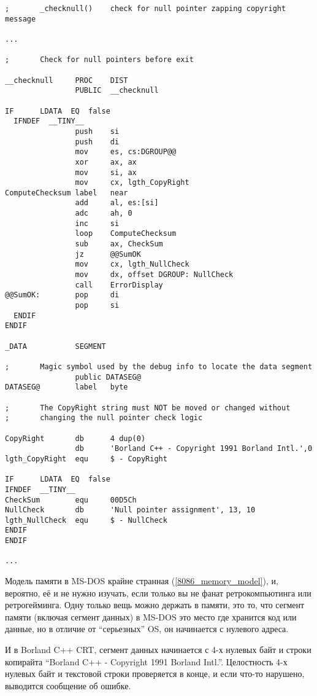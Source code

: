 \begin{lstlisting}[style=customasmx86]
;       _checknull()    check for null pointer zapping copyright message

...

;       Check for null pointers before exit

__checknull     PROC    DIST
                PUBLIC  __checknull

IF      LDATA  EQ  false
  IFNDEF  __TINY__
                push    si
                push    di
                mov     es, cs:DGROUP@@
                xor     ax, ax
                mov     si, ax
                mov     cx, lgth_CopyRight
ComputeChecksum label   near
                add     al, es:[si]
                adc     ah, 0
                inc     si
                loop    ComputeChecksum
                sub     ax, CheckSum
                jz      @@SumOK
                mov     cx, lgth_NullCheck
                mov     dx, offset DGROUP: NullCheck
                call    ErrorDisplay
@@SumOK:        pop     di
                pop     si
  ENDIF
ENDIF

_DATA           SEGMENT

;       Magic symbol used by the debug info to locate the data segment
                public DATASEG@
DATASEG@        label   byte

;       The CopyRight string must NOT be moved or changed without
;       changing the null pointer check logic

CopyRight       db      4 dup(0)
                db      'Borland C++ - Copyright 1991 Borland Intl.',0
lgth_CopyRight  equ     $ - CopyRight

IF      LDATA  EQ  false
IFNDEF  __TINY__
CheckSum        equ     00D5Ch
NullCheck       db      'Null pointer assignment', 13, 10
lgth_NullCheck  equ     $ - NullCheck
ENDIF
ENDIF

...

\end{lstlisting}

Модель памяти в MS-DOS крайне странная (\ref{8086_memory_model}), и, вероятно, её и не нужно изучать, если только вы не фанат ретрокомпьютинга
или ретрогейминга.
Одну только вещь можно держать в памяти, это то, что сегмент памяти (включая сегмент данных) в MS-DOS это место где
хранится код или данные, но в отличие от ``серьезных'' \ac{OS}, он начинается с нулевого адреса.

И в Borland C++ \ac{CRT}, сегмент данных начинается с 4-х нулевых байт и строки копирайта
``Borland C++ - Copyright 1991 Borland Intl.''.
Целостность 4-х нулевых байт и текстовой строки проверяется в конце, и если что-то нарушено, выводится сообщение об ошибке.

